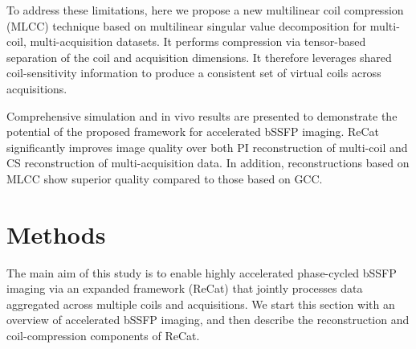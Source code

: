 \documentclass[11pt, onecolumn]{article}
\begin{document}
To address these limitations, here we propose a new multilinear coil compression (MLCC) technique based on multilinear singular value decomposition for multi-coil, multi-acquisition datasets. It performs compression via tensor-based separation of the coil and acquisition dimensions. It therefore leverages shared coil-sensitivity information to produce a consistent set of virtual coils across acquisitions. 

Comprehensive simulation and in vivo results are presented to demonstrate the potential of the proposed framework for accelerated bSSFP imaging. ReCat significantly improves image quality over both PI reconstruction of multi-coil and CS reconstruction of multi-acquisition data. In addition, reconstructions based on MLCC show superior quality compared to those based on GCC.


\clearpage
\section*{Methods}
The main aim of this study is to enable highly accelerated phase-cycled bSSFP imaging via an expanded framework (ReCat) that jointly processes data aggregated across multiple coils and acquisitions. We start this section with an overview of accelerated bSSFP imaging, and then describe the reconstruction and coil-compression components of ReCat. 

\end{document}
